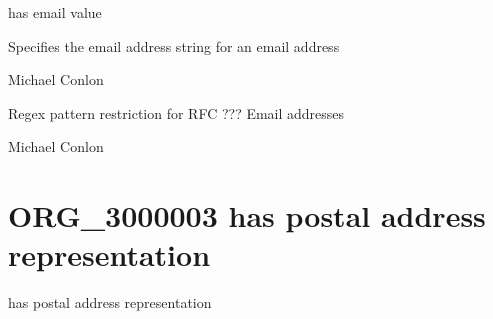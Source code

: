 \documentclass[letterpaper,10pt,english]{sphinxmanual}
\begin{document}
\begin{sphinxShadowBox}

\sphinxAtStartPar
has email value
\end{sphinxShadowBox}

\begin{sphinxShadowBox}

\sphinxAtStartPar
Specifies the email address string for an email address
\end{sphinxShadowBox}

\begin{sphinxShadowBox}

\sphinxAtStartPar
Michael Conlon 
\end{sphinxShadowBox}

\begin{sphinxShadowBox}

\sphinxAtStartPar
{}
\end{sphinxShadowBox}

\begin{sphinxShadowBox}

\sphinxAtStartPar
Regex pattern restriction for RFC ??? Email addresses
\end{sphinxShadowBox}

\begin{sphinxShadowBox}

\sphinxAtStartPar
Michael Conlon 
\end{sphinxShadowBox}
\begin{quote}

\ignorespaces \end{quote}


\section{ORG\_3000003 \sphinxhyphen{} has postal address representation}
\label{\detokenize{doc-ORG_3000003:org-3000003-has-postal-address-representation}}\label{\detokenize{doc-ORG_3000003:index-0}}\label{\detokenize{doc-ORG_3000003::doc}}
\begin{sphinxShadowBox}

\sphinxAtStartPar
has postal address representation
\end{sphinxShadowBox}
\end{document}
